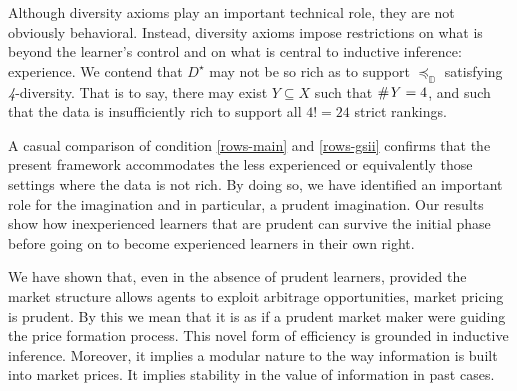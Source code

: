 \documentclass[12pt,a4paper,twoside]{article}
\newcommand{\preceqb}{\mathbin{\preceq}}
\newcommand{\countof}{\mathbin{\#}\hskip1pt}
\newcommand{\mbbd}{{\mathds D}}
\newcommand{\past}{{D^\star}}
\newcommand{\fourdiv}{\textit{4}-\textup{diversity}}
\begin{document}
Although diversity axioms play an important technical role, they are not
obviously behavioral. Instead, diversity axioms impose restrictions on what is
beyond the learner's control and on what is central to inductive inference:
experience. We contend that $\past$ may not be so rich as to support
$\preceqb_{\mbbd}$ satisfying \fourdiv. That is to say, there may exist $Y
\subseteq X$ such that $\countof Y = 4$, and such that the data is
insufficiently rich to support all $4 ! = 24$ strict rankings.

A casual comparison of condition \ref{rows-main} and \ref{rows-gsii} confirms
that the present framework accommodates the less experienced or equivalently
those settings where the data is not rich.  By doing so, we have identified an
important role for the imagination and in particular, a prudent imagination.
Our results show how inexperienced learners that are prudent can survive the
initial phase before going on to become experienced learners in their own
right.

We have shown that, even in the absence of prudent learners, provided the
market structure allows agents to exploit arbitrage opportunities, market
pricing is prudent. By this we mean that it is as if a prudent market maker
were guiding the price formation process. This novel form of efficiency is
grounded in inductive inference. Moreover, it implies a modular nature to the
way information is built into market prices. It implies stability in the
value of information in past cases. 
\end{document}
